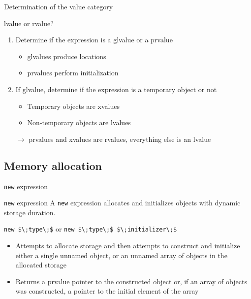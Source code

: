\begin{frame}{Determination of the value category}{}
  \begin{block}{lvalue or rvalue?}
    \begin{enumerate}
    \item
      Determine if the expression is a glvalue or a prvalue
      \begin{itemize}
      \item
        glvalues produce locations
      \item
        prvalues perform initialization
      \end{itemize}
    \item
      If glvalue, determine if the expression is a temporary object or not
      \begin{itemize}
      \item
        Temporary objects are xvalues
      \item
        Non-temporary objects are lvalues
      \end{itemize}
    \item[$\to$]
      prvalues and xvalues are rvalues, everything else is an lvalue
    \end{enumerate}
  \end{block}
\end{frame}


\subsection{Memory allocation}

\begin{frame}{\texttt{new} expression}{}
  \begin{block}{\texttt{new} expression}
    A \lstinline!new! expression allocates and initializes objects with dynamic storage duration.

    {
      \hfill\lstinline[mathescape]!new $\;type\;$! or \lstinline[mathescape]!new $\;type\;$ $\;initializer\;$!\hfill
    }
    \begin{itemize}
    \item
      Attempts to allocate storage and then attempts to construct and initialize either a single unnamed object, or an unnamed array of objects in the allocated storage
    \item
      Returns a prvalue pointer to the constructed object or, if an array of objects was constructed, a pointer to the initial element of the array
    \end{itemize}
  \end{block}

  \begin{example}
  \end{example}
\end{frame}

